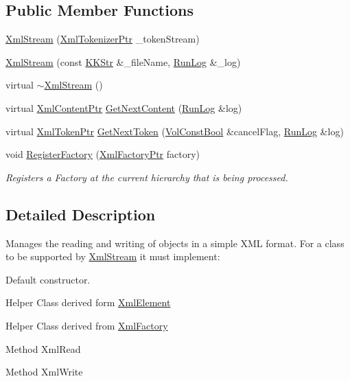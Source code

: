 \subsection*{Public Member Functions}
\begin{DoxyCompactItemize}
\item 
\hyperlink{class_k_k_b_1_1_xml_stream_a6703ccd123b23bacb7303162d05604a5}{Xml\+Stream} (\hyperlink{namespace_k_k_b_a0272123692093dc63b5e530719bc874e}{Xml\+Tokenizer\+Ptr} \+\_\+token\+Stream)
\item 
\hyperlink{class_k_k_b_1_1_xml_stream_a5f27764abb4e5b6f18ad0a4b57dbadc0}{Xml\+Stream} (const \hyperlink{class_k_k_b_1_1_k_k_str}{K\+K\+Str} \&\+\_\+file\+Name, \hyperlink{class_k_k_b_1_1_run_log}{Run\+Log} \&\+\_\+log)
\item 
virtual \hyperlink{class_k_k_b_1_1_xml_stream_a64586630d4215b52a77b3816bb4cdf54}{$\sim$\+Xml\+Stream} ()
\item 
virtual \hyperlink{namespace_k_k_b_a0ac08d955397a4ffcc62ce7aab18105f}{Xml\+Content\+Ptr} \hyperlink{class_k_k_b_1_1_xml_stream_a1709dd71d4311c8c7bab36c24f4b90ff}{Get\+Next\+Content} (\hyperlink{class_k_k_b_1_1_run_log}{Run\+Log} \&log)
\item 
virtual \hyperlink{namespace_k_k_b_af349a060847626df6b468fe15d373972}{Xml\+Token\+Ptr} \hyperlink{class_k_k_b_1_1_xml_stream_a87cc738b05c666cf5d5c25beaab477b4}{Get\+Next\+Token} (\hyperlink{namespace_k_k_b_a7d390f568e2831fb76b86b56c87bf92f}{Vol\+Const\+Bool} \&cancel\+Flag, \hyperlink{class_k_k_b_1_1_run_log}{Run\+Log} \&log)
\item 
void \hyperlink{class_k_k_b_1_1_xml_stream_a2ac75e5851d105268ebb9d361f552a67}{Register\+Factory} (\hyperlink{namespace_k_k_b_a39be21bf55480cb360e2fd785ad60af1}{Xml\+Factory\+Ptr} factory)
\begin{DoxyCompactList}\small\item\em Registers a Factory at the current hierarchy that is being processed. \end{DoxyCompactList}\end{DoxyCompactItemize}


\subsection{Detailed Description}
Manages the reading and writing of objects in a simple X\+ML format. For a class to be supported by \hyperlink{class_k_k_b_1_1_xml_stream}{Xml\+Stream} it must implement\+: 


\begin{DoxyItemize}
\item Default constructor.
\item Helper Class derived form \hyperlink{class_k_k_b_1_1_xml_element}{Xml\+Element}
\item Helper Class derived from \hyperlink{class_k_k_b_1_1_xml_factory}{Xml\+Factory}
\item Method Xml\+Read
\item Method Xml\+Write 
\end{DoxyItemize}

